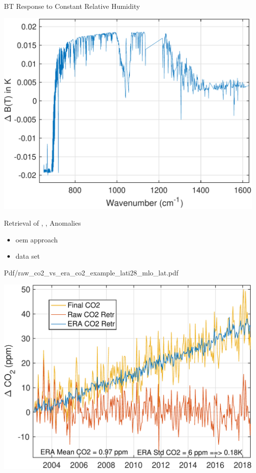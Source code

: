 \documentclass[10pt,t]{beamer}
\begin{document}
\begin{frame}[label={sec:orgfd7cc25}]{BT Response to Constant Relative Humidity}
\begin{center}
\includegraphics[width=0.7\linewidth]{./Figs/Pdf/dbt_constantRH_dsurf_dtrop=0.02k_dstrat=m0.02k.pdf}
\end{center}
\end{frame}
\begin{frame}[label={sec:orgf37514f}]{Retrieval of \cd, \nitrous, \methane Anomalies}
\begin{itemize}
\item oem approach
\item data set
\end{itemize}
\end{frame}
\begin{frame}[label={sec:org3b488db}]{Pdf/raw\_co2\_vs\_era\_co2\_example\_lati28\_mlo\_lat.pdf}
\begin{center}
\includegraphics[width=0.7\linewidth]{./Figs/Pdf/raw_co2_vs_era_co2_example_lati28_mlo_lat.pdf}
\end{center}
\end{frame}
\end{document}
